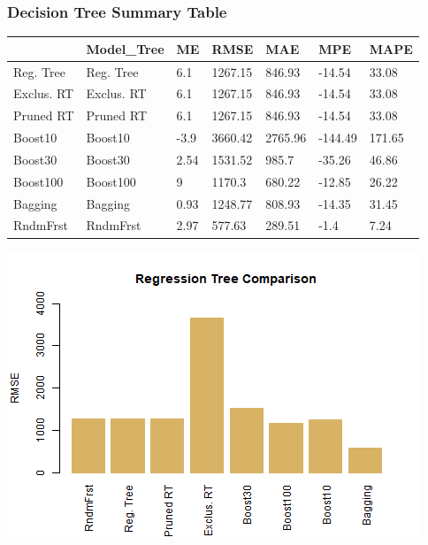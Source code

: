 \documentclass[
  paper=a4,
  ,captions=tableheading
]{scrartcl}
\begin{document}
\hypertarget{decision-tree-summary-table}{%
\subsubsection{Decision Tree Summary
Table}\label{decision-tree-summary-table}}

\begin{table}[!h]
\centering
\begin{tabu} to 
\hline
  & Model\_Tree & ME & RMSE & MAE & MPE & MAPE\\
\hline
Reg. Tree & Reg. Tree & 6.1 & 1267.15 & 846.93 & -14.54 & 33.08\\
\hline
Exclus. RT & Exclus. RT & 6.1 & 1267.15 & 846.93 & -14.54 & 33.08\\
\hline
Pruned RT & Pruned RT & 6.1 & 1267.15 & 846.93 & -14.54 & 33.08\\
\hline
Boost10 & Boost10 & -3.9 & 3660.42 & 2765.96 & -144.49 & 171.65\\
\hline
Boost30 & Boost30 & 2.54 & 1531.52 & 985.7 & -35.26 & 46.86\\
\hline
Boost100 & Boost100 & 9 & 1170.3 & 680.22 & -12.85 & 26.22\\
\hline
Bagging & Bagging & 0.93 & 1248.77 & 808.93 & -14.35 & 31.45\\
\hline
RndmFrst & RndmFrst & 2.97 & 577.63 & 289.51 & -1.4 & 7.24\\
\hline
\end{tabu}
\end{table}

\begin{center}\includegraphics{Diamonds_PDF_files/figure-latex/RegTree Summary-1} \end{center}
\end{document}

